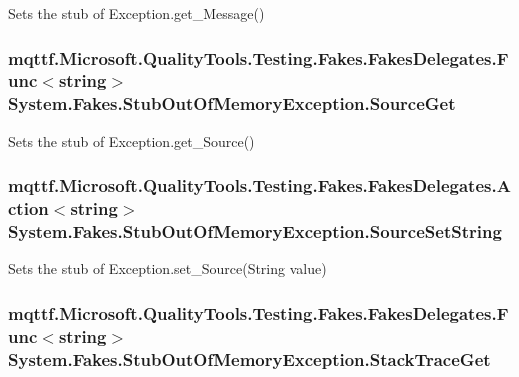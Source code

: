 Sets the stub of Exception.\-get\-\_\-\-Message()

\hypertarget{class_system_1_1_fakes_1_1_stub_out_of_memory_exception_aafc73dedf732584724f2ba4b9a130b63}{
\subsubsection[{Source\-Get}]{\setlength{\rightskip}{0pt plus 5cm}mqttf.\-Microsoft.\-Quality\-Tools.\-Testing.\-Fakes.\-Fakes\-Delegates.\-Func$<$string$>$ System.\-Fakes.\-Stub\-Out\-Of\-Memory\-Exception.\-Source\-Get}}\label{class_system_1_1_fakes_1_1_stub_out_of_memory_exception_aafc73dedf732584724f2ba4b9a130b63}


Sets the stub of Exception.\-get\-\_\-\-Source()

\hypertarget{class_system_1_1_fakes_1_1_stub_out_of_memory_exception_ab0d9f1e3ba0525b4cb6844857e1ee108}{
\subsubsection[{Source\-Set\-String}]{\setlength{\rightskip}{0pt plus 5cm}mqttf.\-Microsoft.\-Quality\-Tools.\-Testing.\-Fakes.\-Fakes\-Delegates.\-Action$<$string$>$ System.\-Fakes.\-Stub\-Out\-Of\-Memory\-Exception.\-Source\-Set\-String}}\label{class_system_1_1_fakes_1_1_stub_out_of_memory_exception_ab0d9f1e3ba0525b4cb6844857e1ee108}


Sets the stub of Exception.\-set\-\_\-\-Source(\-String value)

\hypertarget{class_system_1_1_fakes_1_1_stub_out_of_memory_exception_a00566ba5d9c34c16583d04309995a1ab}{
\subsubsection[{Stack\-Trace\-Get}]{\setlength{\rightskip}{0pt plus 5cm}mqttf.\-Microsoft.\-Quality\-Tools.\-Testing.\-Fakes.\-Fakes\-Delegates.\-Func$<$string$>$ System.\-Fakes.\-Stub\-Out\-Of\-Memory\-Exception.\-Stack\-Trace\-Get}}\label{class_system_1_1_fakes_1_1_stub_out_of_memory_exception_a00566ba5d9c34c16583d04309995a1ab}


